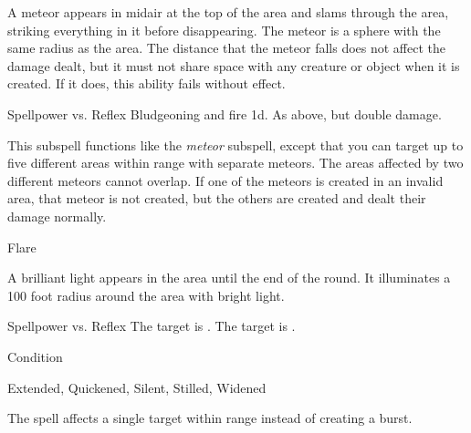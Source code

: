\begin{spellcontent}
\begin{augmenttargetinginfo}
\end{augmenttargetinginfo}
\begin{augmenteffects}
\spelleffect
A meteor appears in midair at the top of the area and slams through the area, striking everything in it before disappearing.
The meteor is a sphere with the same radius as the area.
The distance that the meteor falls does not affect the damage dealt, but it must not share space with any creature or object when it is created.
If it does, this ability fails without effect.
\begin{spellattack}{Spellpower vs. Reflex}
\spellsuccess Bludgeoning and fire  \minus1d.
\spellcritical As above, but double damage.
\end{spellattack}
\end{augmenteffects}
\end{spellcontent}
This subspell functions like the \textit{meteor} subspell, except that you can target up to five different areas within range with separate meteors.
The areas affected by two different meteors cannot overlap.
If one of the meteors is created in an invalid area, that meteor is not created, but the others are created and dealt their damage normally.
\begin{spellsection}{Flare}
\begin{spellcontent}
\begin{spelltargetinginfo}
\end{spelltargetinginfo}
\begin{spelleffects}
\spelleffect
A brilliant light appears in the area until the end of the round.
It illuminates a 100 foot radius around the area with bright light.
\begin{spellattack}{Spellpower vs. Reflex}
\spellsuccess
The target is \dazzled.
\spellcritical
The target is \blinded.
\end{spellattack}
\spelldur Condition
\end{spelleffects}
\end{spellcontent}
\begin{spellfooter}
 Extended, Quickened, Silent, Stilled, Widened
\end{spellfooter}
\begin{spellsubcontent}
\begin{spellcantrip}
The spell affects a single target within range instead of creating a burst.
\end{spellcantrip}
\end{spellsubcontent}
\end{spellsection}
